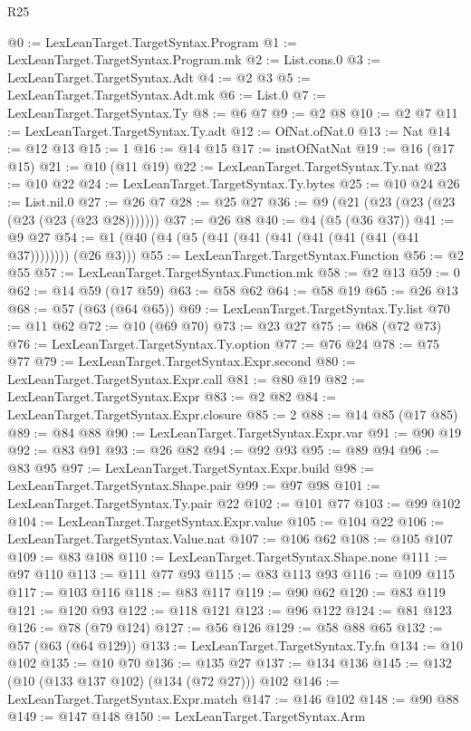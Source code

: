 \begin{lexlean}{R25}
\begin{coremodule}
@0 := LexLeanTarget.TargetSyntax.Program
@1 := LexLeanTarget.TargetSyntax.Program.mk
@2 := List.cons.{0}
@3 := LexLeanTarget.TargetSyntax.Adt
@4 := @2 @3
@5 := LexLeanTarget.TargetSyntax.Adt.mk
@6 := List.{0}
@7 := LexLeanTarget.TargetSyntax.Ty
@8 := @6 @7
@9 := @2 @8
@10 := @2 @7
@11 := LexLeanTarget.TargetSyntax.Ty.adt
@12 := OfNat.ofNat.{0}
@13 := Nat
@14 := @12 @13
@15 := 1
@16 := @14 @15
@17 := instOfNatNat
@19 := @16 (@17 @15)
@21 := @10 (@11 @19)
@22 := LexLeanTarget.TargetSyntax.Ty.nat
@23 := @10 @22
@24 := LexLeanTarget.TargetSyntax.Ty.bytes
@25 := @10 @24
@26 := List.nil.{0}
@27 := @26 @7
@28 := @25 @27
@36 := @9 (@21 (@23 (@23 (@23 (@23 (@23 (@23 @28)))))))
@37 := @26 @8
@40 := @4 (@5 (@36 @37))
@41 := @9 @27
@54 := @1 (@40 (@4 (@5 (@41 (@41 (@41 (@41 (@41 (@41 (@41 @37)))))))) (@26 @3)))
@55 := LexLeanTarget.TargetSyntax.Function
@56 := @2 @55
@57 := LexLeanTarget.TargetSyntax.Function.mk
@58 := @2 @13
@59 := 0
@62 := @14 @59 (@17 @59)
@63 := @58 @62
@64 := @58 @19
@65 := @26 @13
@68 := @57 (@63 (@64 @65))
@69 := LexLeanTarget.TargetSyntax.Ty.list
@70 := @11 @62
@72 := @10 (@69 @70)
@73 := @23 @27
@75 := @68 (@72 @73)
@76 := LexLeanTarget.TargetSyntax.Ty.option
@77 := @76 @24
@78 := @75 @77
@79 := LexLeanTarget.TargetSyntax.Expr.second
@80 := LexLeanTarget.TargetSyntax.Expr.call
@81 := @80 @19
@82 := LexLeanTarget.TargetSyntax.Expr
@83 := @2 @82
@84 := LexLeanTarget.TargetSyntax.Expr.closure
@85 := 2
@88 := @14 @85 (@17 @85)
@89 := @84 @88
@90 := LexLeanTarget.TargetSyntax.Expr.var
@91 := @90 @19
@92 := @83 @91
@93 := @26 @82
@94 := @92 @93
@95 := @89 @94
@96 := @83 @95
@97 := LexLeanTarget.TargetSyntax.Expr.build
@98 := LexLeanTarget.TargetSyntax.Shape.pair
@99 := @97 @98
@101 := LexLeanTarget.TargetSyntax.Ty.pair @22
@102 := @101 @77
@103 := @99 @102
@104 := LexLeanTarget.TargetSyntax.Expr.value
@105 := @104 @22
@106 := LexLeanTarget.TargetSyntax.Value.nat
@107 := @106 @62
@108 := @105 @107
@109 := @83 @108
@110 := LexLeanTarget.TargetSyntax.Shape.none
@111 := @97 @110
@113 := @111 @77 @93
@115 := @83 @113 @93
@116 := @109 @115
@117 := @103 @116
@118 := @83 @117
@119 := @90 @62
@120 := @83 @119
@121 := @120 @93
@122 := @118 @121
@123 := @96 @122
@124 := @81 @123
@126 := @78 (@79 @124)
@127 := @56 @126
@129 := @58 @88 @65
@132 := @57 (@63 (@64 @129))
@133 := LexLeanTarget.TargetSyntax.Ty.fn
@134 := @10 @102
@135 := @10 @70
@136 := @135 @27
@137 := @134 @136
@145 := @132 (@10 (@133 @137 @102) (@134 (@72 @27))) @102
@146 := LexLeanTarget.TargetSyntax.Expr.match
@147 := @146 @102
@148 := @90 @88
@149 := @147 @148
@150 := LexLeanTarget.TargetSyntax.Arm

\end{coremodule}
\end{lexlean}
